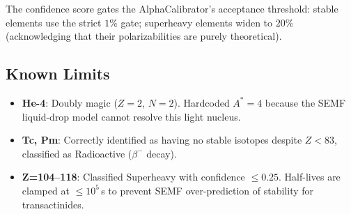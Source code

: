 \documentclass[11pt,letterpaper]{article}
\begin{document}
\noindent
The confidence score gates the AlphaCalibrator's acceptance threshold:
stable elements use the strict $1\%$ gate; superheavy elements widen to
$20\%$ (acknowledging that their polarizabilities are purely theoretical).

\subsection{Known Limits}

\begin{itemize}
\item \textbf{He-4}: Doubly magic ($Z{=}2$, $N{=}2$).  Hardcoded $A^* = 4$
  because the SEMF liquid-drop model cannot resolve this light nucleus.

\item \textbf{Tc, Pm}: Correctly identified as having no stable isotopes
  despite $Z < 83$, classified as Radioactive ($\beta^-$ decay).

\item \textbf{Z=104--118}: Classified Superheavy with confidence
  $\leq 0.25$.  Half-lives are clamped at $\leq 10^5$\,s to prevent
  SEMF over-prediction of stability for transactinides.
\end{itemize}
\end{document}
